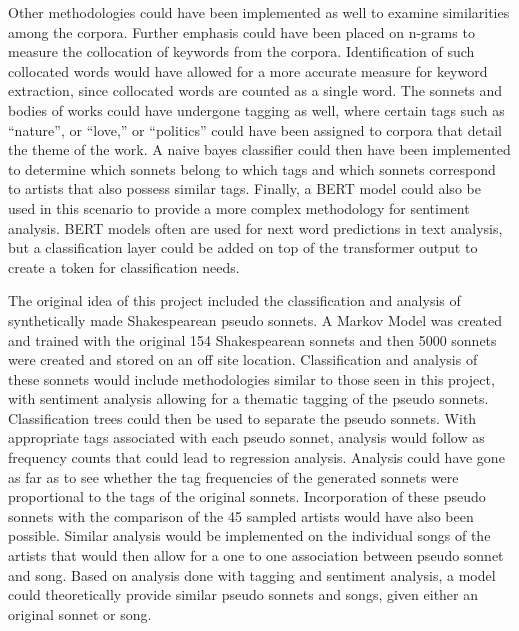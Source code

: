 \documentclass[10pt,a4paper]{article}
\begin{document}
\noindent Other methodologies could have been implemented as well to examine similarities among the corpora. Further emphasis could have been placed on n-grams to measure the collocation of keywords from the corpora. Identification of such collocated words would have allowed for a more accurate measure for keyword extraction, since collocated words are counted as a single word. The sonnets and bodies of works could have undergone tagging as well, where certain tags such as “nature”, or “love,” or “politics” could have been assigned to corpora that detail the theme of the work. A naive bayes classifier could then have been implemented to determine which sonnets belong to which tags and which sonnets correspond to artists that also possess similar tags. Finally, a BERT model could also be used in this scenario to provide a more complex methodology for sentiment analysis. BERT models often are used for next word predictions in text analysis, but a classification layer could be added on top of the transformer output to create a token for classification needs. 

\noindent The original idea of this project included the classification and analysis of synthetically made Shakespearean pseudo sonnets. A Markov Model was created and trained with the original 154 Shakespearean sonnets and then 5000 sonnets were created and stored on an off site location. Classification and analysis of these sonnets would include methodologies similar to those seen in this project, with sentiment analysis allowing for a thematic tagging of the pseudo sonnets. Classification trees could then be used to separate the pseudo sonnets. With appropriate tags associated with each pseudo sonnet, analysis would follow as frequency counts that could lead to regression analysis. Analysis could have gone as far as to see whether the tag frequencies of the generated sonnets were proportional to the tags of the original sonnets. Incorporation of these pseudo sonnets with the comparison of the 45 sampled artists would have also been possible. Similar analysis would be implemented on the individual songs of the artists that would then allow for a one to one association between pseudo sonnet and song. Based on analysis done with tagging and sentiment analysis, a model could theoretically provide similar pseudo sonnets and songs, given either an original sonnet or song.
\end{document}
